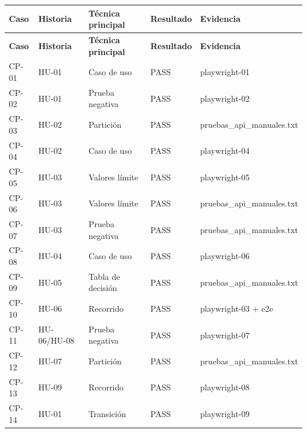 \documentclass[11pt,a4paper]{article}
\begin{document}
{\small
\begin{longtable}{|p{}|p{}|p{}|p{}|p{}|}
\rowcolor{UTECblue}\color{white}\bfseries Caso & \color{white}\bfseries Historia & \color{white}\bfseries Técnica principal & \color{white}\bfseries Resultado & \color{white}\bfseries Evidencia \\ \hline
\endfirsthead
\rowcolor{UTECblue}\color{white}\bfseries Caso & \color{white}\bfseries Historia & \color{white}\bfseries Técnica principal & \color{white}\bfseries Resultado & \color{white}\bfseries Evidencia \\ \hline
\endhead
CP-01 & HU-01 & Caso de uso & {\color{green!60!black}{$\checkmark$}} PASS & playwright-01 \\ \hline
CP-02 & HU-01 & Prueba negativa & {\color{green!60!black}{$\checkmark$}} PASS & playwright-02 \\ \hline
CP-03 & HU-02 & Partición & {\color{green!60!black}{$\checkmark$}} PASS & pruebas\_api\_manuales.txt \\ \hline
CP-04 & HU-02 & Caso de uso & {\color{green!60!black}{$\checkmark$}} PASS & playwright-04 \\ \hline
CP-05 & HU-03 & Valores límite & {\color{green!60!black}{$\checkmark$}} PASS & playwright-05 \\ \hline
CP-06 & HU-03 & Valores límite & {\color{green!60!black}{$\checkmark$}} PASS & pruebas\_api\_manuales.txt \\ \hline
CP-07 & HU-03 & Prueba negativa & {\color{green!60!black}{$\checkmark$}} PASS & pruebas\_api\_manuales.txt \\ \hline
CP-08 & HU-04 & Caso de uso & {\color{green!60!black}{$\checkmark$}} PASS & playwright-06 \\ \hline
CP-09 & HU-05 & Tabla de decisión & {\color{green!60!black}{$\checkmark$}} PASS & pruebas\_api\_manuales.txt \\ \hline
CP-10 & HU-06 & Recorrido & {\color{green!60!black}{$\checkmark$}} PASS & playwright-03 + e2e \\ \hline
CP-11 & HU-06/HU-08 & Prueba negativa & {\color{green!60!black}{$\checkmark$}} PASS & playwright-07 \\ \hline
CP-12 & HU-07 & Partición & {\color{green!60!black}{$\checkmark$}} PASS & pruebas\_api\_manuales.txt \\ \hline
CP-13 & HU-09 & Recorrido & {\color{green!60!black}{$\checkmark$}} PASS & playwright-08 \\ \hline
CP-14 & HU-01 & Transición & {\color{green!60!black}{$\checkmark$}} PASS & playwright-09 \\ \hline
\end{longtable}}
\end{document}
